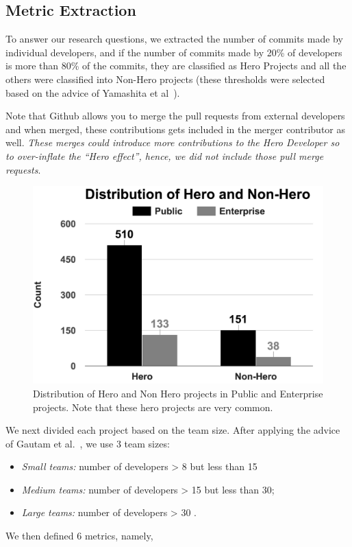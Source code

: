 \documentclass[sigconf]{acmart}
\newcommand{\bi}{\begin{itemize}[leftmargin=0.4cm]}
\newcommand{\ei}{\end{itemize}}
\theoremstyle{break}
\begin{document}
\subsection{Metric Extraction}
\label{sec:metric}

To answer our research questions, we extracted the number of commits made by individual developers, and if the number of commits made by 20\% of developers is more than 80\% of the commits, they are classified as Hero Projects and all the others were classified into Non-Hero projects
(these thresholds were selected based on the advice of Yamashita et al~\cite{yamashita2015revisiting}). 

Note that Github allows you to merge the pull requests from external developers and when merged, these contributions gets included in the merger contributor as well. \textit{These merges could introduce more contributions to the Hero Developer so to over-inflate the ``Hero effect'', hence, we did not include those pull merge requests}.

 \begin{figure}[!b]
  \centering
\includegraphics[width=.5\linewidth]{./fig/rq1.png}
  \caption{ Distribution of Hero and Non Hero projects in Public and Enterprise projects.
  Note that these hero projects are very common.}
  \label{fig:rq1}
\end{figure}

We next   divided each project based on the team size. After applying the advice
of Gautam et al.~\cite{gautam2017empirical}, we use 3 team sizes:
\bi
\item {\em Small teams:}  number of developers > 8 but less than 15
\item {\em Medium teams:} number of developers > 15 but less than 30; 
\item {\em Large teams:} number of developers > 30 .
\ei
 
We then defined 6 metrics, namely,
 
\end{document}
